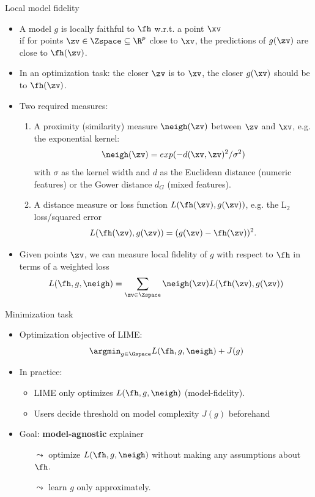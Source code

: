 \documentclass[11pt,compress,t,notes=noshow, aspectratio=169, xcolor=table]{beamer}
\begin{document}
\begin{frame}{Local model fidelity}
 	\begin{itemize}
 		\item A model $g$ is locally faithful to $\fh$ w.r.t. a point $\xv$\\ 
 		if for points $\zv \in \Zspace \subseteq \R^p$ close to $\xv$, the predictions of $g(\zv)$ are close to $\fh(\zv)$. 
 		\item In an optimization task: the closer $\zv$ is to $\xv$, the closer $g(\xv)$ should be to $\fh(\zv)$.  
 		\pause
 		\item Two required measures:
 		\begin{enumerate}
 			\item A proximity (similarity) measure $\neigh(\zv)$ between $\zv$ and $\xv$, e.g. the exponential kernel:
 			$$\neigh(\zv) = exp(-d(\xv, \zv)^2/\sigma^2)$$ 
 			with $\sigma$ as the kernel width and $d$ as the Euclidean distance (numeric features) or the Gower distance $d_G$ (mixed features). 
 			\pause
 			\item A distance measure or loss function $L(\fh(\zv), g(\zv))$, e.g. the L$_2$ loss/squared error
 			$$L(\fh(\zv), g(\zv)) = (g(\zv) - \fh(\zv))^2.$$ 
 		\end{enumerate}
 		\pause
 		\item Given points $\zv$, we can measure local fidelity of $g$ with respect to $\fh$ in terms of a weighted loss
 		$$ L(\fh, g, \neigh) = \sum_{\zv \in \Zspace} \neigh(\zv) L(\fh(\zv), g(\zv)) $$
 	\end{itemize}
\end{frame}

\begin{frame}[c]{Minimization task}
	\begin{itemize}
		\item Optimization objective of LIME: 
		$$ \argmin_{g \in \Gspace} L(\fh, g, \neigh) + J(g)$$
		\item In practice:
		\begin{itemize}
		    \item LIME only optimizes $L(\fh, g, \neigh)$ (model-fidelity). 	
		    \item Users decide threshold on model complexity $J(g)$ beforehand
		\end{itemize}
		\item Goal: \textbf{model-agnostic} explainer
		\begin{itemize}
    		\item[$\leadsto$] optimize $L(\fh, g, \neigh)$ without making any assumptions about $\fh$. 
    		\item[$\leadsto$] learn $g$ only approximately.  
		\end{itemize}
		\end{itemize}
\end{frame} 
\end{document}
